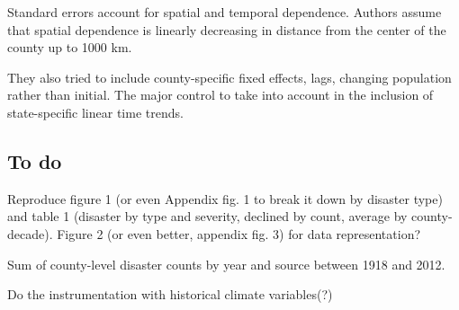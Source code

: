 \documentclass[11pt, oneside]{article}   	%
\begin{document}
Standard errors account for spatial and temporal dependence. Authors assume that spatial dependence is linearly decreasing in distance from the center of the county up to 1000 km.

They also tried to include county-specific fixed effects, lags, changing population rather than initial. The major control to take into account in the inclusion of state-specific linear time trends.

\subsection{To do}
Reproduce figure 1 (or even Appendix fig. 1 to break it down by disaster type) and table 1 (disaster by type and severity, declined by count, average by county-decade). Figure 2 (or even better, appendix fig. 3) for data representation?

Sum of county-level disaster counts by year and source between 1918 and 2012.

Do the instrumentation with historical climate variables(?)
\end{document}
